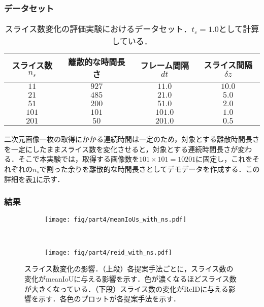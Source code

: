     \subsubsection{データセット}

    \begin{table}[t]
        \centering
        \caption[スライス数変化の評価実験におけるデータセット]{スライス数変化の評価実験におけるデータセット．$t_c = 1.0$として計算している．}
        \label{tab:ns_exp_detail}
        \begin{tabular}{c|ccc}
            スライス数$n_s$ & 離散的な時間長さ & フレーム間隔$dt$ & スライス間隔$\delta z$ 
            \\ \hline \hline
            $11$ & $927$ & $11.0$ & $10.0$
            \\ $21$ & $485$ & $21.0$ & $5.0$
            \\ $51$ & $200$ & $51.0$ & $2.0$
            \\ $101$ & $101$ & $101.0$ & $1.0$
            \\ $201$ & $50$ & $201.0$ & $0.5$
        \end{tabular}
    \end{table}

    二次元画像一枚の取得にかかる連続時間は一定のため，対象とする離散時間長さを一定にしたままスライス数を変化させると，対象とする連続時間長さが変わる．そこで本実験では，取得する画像数を$101 \times 101 = 10201$に固定し，これをそれぞれの$n_s$で割った余りを離散的な時間長さとしてデモデータを作成する．この詳細を表\ref{tab:ns_exp_detail}に示す．

    \subsubsection{結果}

    \begin{figure}[t]
        \begin{subfigure}[t]{\linewidth}
            \centering
            \texttt{[image: fig/part4/meanIoUs\_with\_ns.pdf]}
        \end{subfigure}
        \\
        \begin{subfigure}[t]{\linewidth}
            \centering
            \texttt{[image: fig/part4/reid\_with\_ns.pdf]}
        \end{subfigure}
        \caption[スライス数変化の影響]{スライス数変化の影響．（上段）各提案手法ごとに，スライス数の変化がmeanIoUに与える影響を示す．色が濃くなるほどスライス数が大きくなっている．（下段）スライス数の変化がReIDに与える影響を示す．各色のプロットが各提案手法を示す．}
        \label{fig:ns_effect}
    \end{figure}


